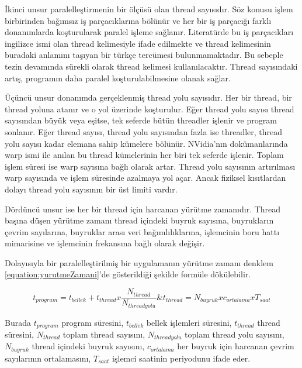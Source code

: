 İkinci unsur paralelleştirmenin bir ölçüsü olan thread sayısıdır. Söz konusu işlem birbirinden bağımsız iş parçacıklarına bölünür ve her bir iş parçacığı farklı donanımlarda koşturularak paralel işleme sağlanır. Literatürde bu iş parçacıkları ingilizce ismi olan thread kelimesiyle ifade edilmekte ve thread kelimesinin buradaki anlamını taşıyan bir türkçe tercümesi bulunmamaktadır. Bu sebeple tezin devamında sürekli olarak thread kelimesi kullanılacaktır. Thread sayısındaki artış, programın daha paralel koşturulabilmesine olanak sağlar.\par

Üçüncü unsur donanımda gerçeklenmiş thread yolu sayısıdır. Her bir thread, bir thread yoluna atanır ve o yol üzerinde koşturulur. Eğer thread yolu sayısı thread sayısından büyük veya eşitse, tek seferde bütün threadler işlenir ve program sonlanır. Eğer thread sayısı, thread yolu sayısından fazla ise threadler, thread yolu sayısı kadar elemana sahip kümelere bölünür. NVidia'nın dokümanlarında warp ismi ile anılan bu thread kümelerinin her biri tek seferde işlenir. Toplam işlem süresi ise warp sayısına bağlı olarak artar. Thread yolu sayısının artırılması warp sayısında ve işlem süresinde azalmaya yol açar. Ancak fiziksel kısıtlardan dolayı thread yolu sayısının bir üst limiti vardır. \par

Dördüncü unsur ise her bir thread için harcanan yürütme zamanıdır. Thread başına düşen yürütme zamanı thread içindeki buyruk sayısına, buyrukların çevrim sayılarına, buyruklar arası veri bağımlılıklarına, işlemcinin boru hattı mimarisine ve işlemcinin frekansına bağlı olarak değişir.\par

Dolayısıyla bir paralelleştirilmiş bir uygulamanın yürütme zamanı denklem \ref{equation:yurutmeZamani}'de gösterildiği şekilde formüle dökülebilir.

\begin{equation} \label{equation:yurutmeZamani}
t_{program} = t_{bellek} + t_{thread} x \frac{N_{thread}}{N_{thread yolu}} \& 
t_{thread} = N_{buyruk} x c_{ortalama} x T_{saat}
\end{equation} 

Burada $t_{program}$ program süresini, $t_{bellek}$ bellek işlemleri süresini, $t_{thread}$ thread süresini, $N_{thread}$ toplam thread sayısını, $N_{thread yolu}$ toplam thread yolu sayısını, $N_{buyruk}$ thread içindeki buyruk sayısını, $c_{ortalama}$ her buyruk için harcanan çevrim sayılarının ortalamasını, $T_{saat}$ işlemci saatinin periyodunu ifade eder.\par

